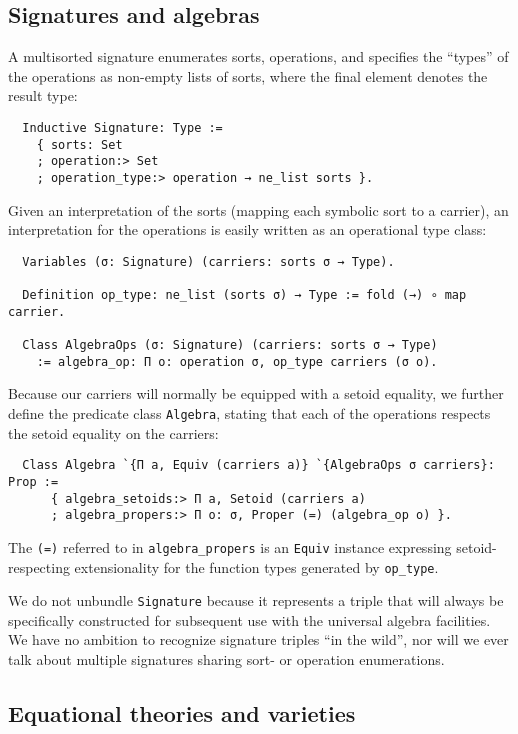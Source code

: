 \documentclass[a4paper,10pt,runningheads]{llncs}
\begin{document}
\subsection{Signatures and algebras}

A multisorted signature enumerates sorts, operations, and specifies the ``types'' of the operations as non-empty lists of sorts, where the final element denotes the result type:
\begin{lstlisting}
  Inductive Signature: Type :=
    { sorts: Set
    ; operation:> Set
    ; operation_type:> operation → ne_list sorts }.
\end{lstlisting}
Given an interpretation of the sorts (mapping each symbolic sort to a carrier), an interpretation for the operations is easily written as an operational type class:
\begin{lstlisting}
  Variables (σ: Signature) (carriers: sorts σ → Type).

  Definition op_type: ne_list (sorts σ) → Type := fold (→) ∘ map carrier.

  Class AlgebraOps (σ: Signature) (carriers: sorts σ → Type)
    := algebra_op: Π o: operation σ, op_type carriers (σ o).
\end{lstlisting}
Because our carriers will normally be equipped with a setoid equality, we further define the predicate class \lstinline|Algebra|, stating that each of the operations respects the setoid equality on the carriers:
\begin{lstlisting}
  Class Algebra `{Π a, Equiv (carriers a)} `{AlgebraOps σ carriers}: Prop :=
      { algebra_setoids:> Π a, Setoid (carriers a)
      ; algebra_propers:> Π o: σ, Proper (=) (algebra_op o) }.
\end{lstlisting}
The \lstinline|(=)| referred to in \lstinline|algebra_propers| is an \lstinline|Equiv| instance expressing setoid-respecting extensionality for the function types generated by \lstinline|op_type|.

We do not unbundle \lstinline|Signature| because it represents a triple that will always be specifically constructed for subsequent use with the universal algebra facilities. We have no ambition to recognize signature triples ``in the wild'', nor will we ever talk about multiple signatures sharing sort- or operation enumerations.

\subsection{Equational theories and varieties}
\label{varieties}
\end{document}
